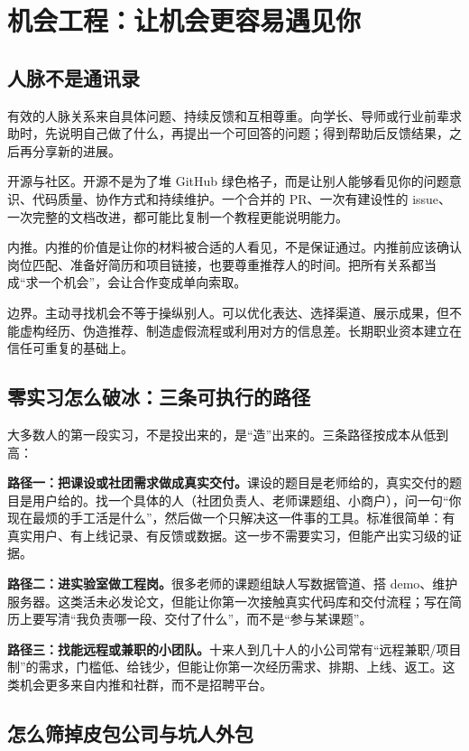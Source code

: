 \documentclass[UTF8,zihao=5,openany]{ctexbook}
\begin{document}
\section{机会工程：让机会更容易遇见你}
\subsection{人脉不是通讯录}
有效的人脉关系来自具体问题、持续反馈和互相尊重。向学长、导师或行业前辈求助时，先说明自己做了什么，再提出一个可回答的问题；得到帮助后反馈结果，之后再分享新的进展。

开源与社区。开源不是为了堆 GitHub 绿色格子，而是让别人能够看见你的问题意识、代码质量、协作方式和持续维护。一个合并的 PR、一次有建设性的 issue、一次完整的文档改进，都可能比复制一个教程更能说明能力。

内推。内推的价值是让你的材料被合适的人看见，不是保证通过。内推前应该确认岗位匹配、准备好简历和项目链接，也要尊重推荐人的时间。把所有关系都当成“求一个机会”，会让合作变成单向索取。

边界。主动寻找机会不等于操纵别人。可以优化表达、选择渠道、展示成果，但不能虚构经历、伪造推荐、制造虚假流程或利用对方的信息差。长期职业资本建立在信任可重复的基础上。

\subsection{零实习怎么破冰：三条可执行的路径}

大多数人的第一段实习，不是投出来的，是“造”出来的。三条路径按成本从低到高：

\textbf{路径一：把课设或社团需求做成真实交付。}课设的题目是老师给的，真实交付的题目是用户给的。找一个具体的人（社团负责人、老师课题组、小商户），问一句“你现在最烦的手工活是什么”，然后做一个只解决这一件事的工具。标准很简单：有真实用户、有上线记录、有反馈或数据。这一步不需要实习，但能产出实习级的证据。

\textbf{路径二：进实验室做工程岗。}很多老师的课题组缺人写数据管道、搭 demo、维护服务器。这类活未必发论文，但能让你第一次接触真实代码库和交付流程；写在简历上要写清“我负责哪一段、交付了什么”，而不是“参与某课题”。

\textbf{路径三：找能远程或兼职的小团队。}十来人到几十人的小公司常有“远程兼职/项目制”的需求，门槛低、给钱少，但能让你第一次经历需求、排期、上线、返工。这类机会更多来自内推和社群，而不是招聘平台。

\subsection{怎么筛掉皮包公司与坑人外包}
\end{document}
